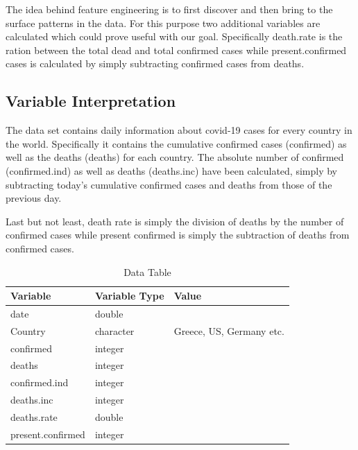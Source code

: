 The idea behind feature engineering is to first discover and then bring to the surface patterns in the data.
For this purpose two additional variables are calculated which could prove useful with our goal.
Specifically \colorbox{yellow!30}{death.rate} is the ration between the total dead and total confirmed cases while \colorbox{yellow!30}{present.confirmed} cases is calculated by simply subtracting confirmed cases from deaths.

\subsection{Variable Interpretation}

The data set contains daily information about covid-19 cases for every country in the world. Specifically it contains the cumulative confirmed cases (confirmed) as well as the deaths (deaths) for each country. The absolute number of confirmed (confirmed.ind) as well as deaths (deaths.inc) have been calculated, simply by subtracting  today's cumulative confirmed cases and deaths from those of the previous day.

Last but not least, death rate is simply the division of deaths by the number of confirmed cases while present confirmed is simply the subtraction of deaths from confirmed cases.

\begin{table}[!h]
\caption{\label{tab:}Data Table}
\centering
\begin{tabular}{@{}|l|l|l|@{}}
\toprule
Variable            & Variable Type & Value                                   \\ \midrule
date                & double        &                                         \\
Country             & character     & Greece, US, Germany etc.                \\
confirmed           & integer       &                                         \\
deaths              & integer       &                                         \\
confirmed.ind       & integer       &                                         \\
deaths.inc          & integer       &                                         \\
deaths.rate         & double        &                                         \\ 
present.confirmed   & integer       &                                         \\ \bottomrule
\end{tabular}
\end{table}

